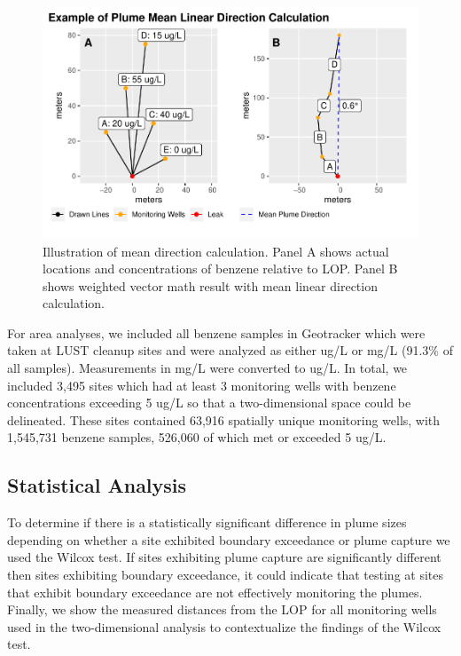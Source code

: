 \documentclass[draft,linenumbers]{agujournal2018}
\begin{document}
\begin{figure}[!h]
\includegraphics{CA_Benzene_Plumes_files/figure-latex/fig1-1} \caption{Illustration of mean direction calculation. Panel A shows actual locations and concentrations of benzene relative to LOP. Panel B shows weighted vector math result with mean linear direction calculation.}\label{fig:fig1}
\end{figure}

For area analyses, we included all benzene samples in Geotracker which
were taken at LUST cleanup sites and were analyzed as either ug/L or
mg/L (91.3\% of all samples). Measurements in mg/L were converted to
ug/L. In total, we included 3,495 sites which had at least 3 monitoring
wells with benzene concentrations exceeding 5 ug/L so that a
two-dimensional space could be delineated. These sites contained 63,916
spatially unique monitoring wells, with 1,545,731 benzene samples,
526,060 of which met or exceeded 5 ug/L.

\subsection{Statistical Analysis}

To determine if there is a statistically significant difference in plume
sizes depending on whether a site exhibited boundary exceedance or plume
capture we used the Wilcox test. If sites exhibiting plume capture are
significantly different then sites exhibiting boundary exceedance, it
could indicate that testing at sites that exhibit boundary exceedance
are not effectively monitoring the plumes. Finally, we show the measured
distances from the LOP for all monitoring wells used in the
two-dimensional analysis to contextualize the findings of the Wilcox
test.
\end{document}
